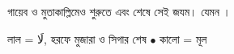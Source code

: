 \vspace{0.25cm}

\noindent গায়েব ও মুতাকাল্লিমেও শুরুতে {\arabicfont \textarabic{}}
এবং শেষে সেই জযম।
যেমন {\arabicfont {}}।

\vspace{0.15cm}

\begin{center}
  {\small
    লাল = {\arabicfont \textarabic{لَا}}, হরফে মুজারা ও সিগার শেষ
    \enspace$\bullet$\enspace
    কালো = মূল
  }
\end{center}
